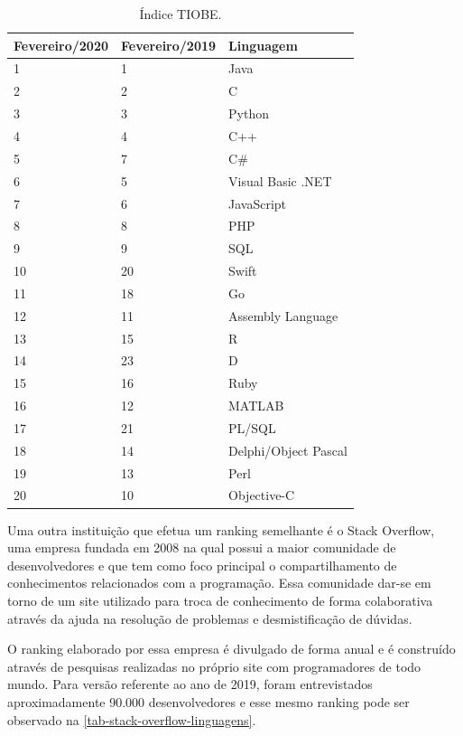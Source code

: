 \begin{table}[htb]
\ABNTEXfontereduzida
\caption[Índice TIOBE]{Índice TIOBE.}
\label{tab-tiobe}
\begin{tabular}{p{2.6cm}|p{2.6cm}|p{4cm}}
   \textbf{Fevereiro/2020} & \textbf{Fevereiro/2019}  & \textbf{Linguagem}  \\
    \hline
    1 & 1 & Java \\
    \hline
    2 & 2 & C \\
    \hline
    3 & 3 & Python \\
    \hline
    4 & 4 & C++ \\
    \hline
    5 & 7 & C\# \\
    \hline
    6 & 5 & Visual Basic .NET \\
    \hline
    7 & 6 & JavaScript \\
    \hline
    8 & 8 & PHP \\
    \hline
    9 & 9 & SQL \\
    \hline
    10 & 20 & Swift \\
    \hline
    11 & 18 & Go \\
    \hline
    12 & 11 & Assembly Language \\
    \hline
    13 & 15 & R \\
    \hline
    14 & 23 & D \\
    \hline
    15 & 16 & Ruby \\
    \hline
    16 & 12 & MATLAB \\
    \hline
    17 & 21 & PL/SQL \\
    \hline
    18 & 14 & Delphi/Object Pascal \\
    \hline
    19 & 13 & Perl \\
    \hline
    20 & 10 & Objective-C \\
\end{tabular}
\end{table}

\newpage
Uma outra instituição que efetua um ranking semelhante é o Stack Overflow, uma empresa fundada em 2008 na qual possui a maior comunidade de desenvolvedores e que tem como foco principal o compartilhamento de conhecimentos relacionados com a programação. Essa comunidade dar-se em torno de um site utilizado para troca de conhecimento de forma colaborativa através da ajuda na resolução de problemas e desmistificação de dúvidas.

O ranking elaborado por essa empresa é divulgado de forma anual e é construído através de pesquisas realizadas no próprio site com programadores de todo mundo. Para versão referente ao ano de 2019, foram entrevistados aproximadamente 90.000 desenvolvedores e esse mesmo ranking pode ser observado na \autoref{tab-stack-overflow-linguagens}.

